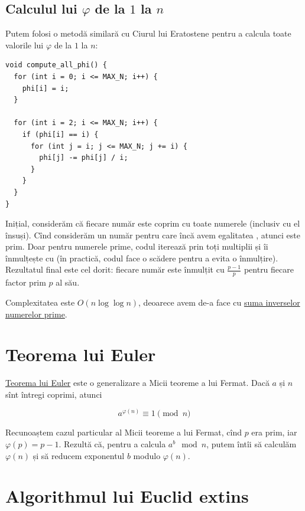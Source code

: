 \documentclass[../main.tex]{subfiles}
\begin{document}
\subsection{Calculul lui \texorpdfstring{$\varphi$}{phi} de la \texorpdfstring{$1$}{1} la \texorpdfstring{$n$}{n}}

Putem folosi o metodă similară cu Ciurul lui Eratostene pentru a calcula toate valorile lui $\varphi$ de la $1$ la $n$:

\begin{verbatim}
void compute_all_phi() {
  for (int i = 0; i <= MAX_N; i++) {
    phi[i] = i;
  }

  for (int i = 2; i <= MAX_N; i++) {
    if (phi[i] == i) {
      for (int j = i; j <= MAX_N; j += i) {
        phi[j] -= phi[j] / i;
      }
    }
  }
}
\end{verbatim}

Inițial, considerăm că fiecare număr este coprim cu toate numerele (inclusiv cu el însuși). Cînd considerăm un număr  pentru care încă avem egalitatea , atunci  este prim. Doar pentru numerele prime, codul iterează prin toți multiplii și îi înmulțește cu  (în practică, codul face o scădere pentru a evita o înmulțire). Rezultatul final este cel dorit: fiecare număr este înmulțit cu $\frac{p-1}{p}$ pentru fiecare factor prim $p$ al său.

Complexitatea este $O(n \log \log n)$, deoarece avem de-a face cu \href{https://en.wikipedia.org/wiki/Divergence_of_the_sum_of_the_reciprocals_of_the_primes}{suma inverselor numerelor prime}.
\section{Teorema lui Euler}

\href{https://en.wikipedia.org/wiki/Euler\%27s_theorem}{Teorema lui Euler} este o generalizare a Micii teoreme a lui Fermat. Dacă $a$ și $n$ sînt întregi coprimi, atunci

$$a^{\varphi(n)} \equiv 1 \pmod{n}$$

Recunoaștem cazul particular al Micii teoreme a lui Fermat, cînd $p$ era prim, iar $\varphi(p) = p - 1$. Rezultă că, pentru a calcula $a^b \mod n$, putem întîi să calculăm $\varphi(n)$ și să reducem exponentul $b$ modulo $\varphi(n)$.


\section{Algorithmul lui Euclid extins}
\end{document}
